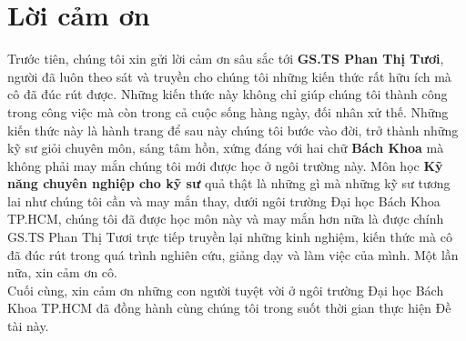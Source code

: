 \documentclass[12pt]{report}
\begin{document}
\newpage
	\chapter*{Lời cảm ơn}
		\par Trước tiên, chúng tôi xin gửi lời cảm ơn sâu sắc tới \textbf{GS.TS Phan Thị Tươi}, người đã luôn theo sát và truyền cho chúng tôi những kiến thức rất hữu ích mà cô đã đúc rút được. Những kiến thức này không chỉ giúp chúng tôi thành công trong công việc mà còn trong cả cuộc sống hàng ngày, đối nhân xử thế. Những kiến thức này là hành trang để sau này chúng tôi bước vào đời, trở thành những kỹ sư giỏi chuyên môn, sáng tâm hồn, xứng đáng với hai chữ \textbf{Bách Khoa} mà không phải may mắn chúng tôi mới được học ở ngôi trường này. Môn học \textbf{Kỹ năng chuyên nghiệp cho kỹ sư} quả thật là những gì mà những kỹ sư tương lai như chúng tôi cần và may mắn thay, dưới ngôi trường Đại học Bách Khoa TP.HCM, chúng tôi đã được học môn này và may mắn hơn nữa là được chính GS.TS Phan Thị Tươi trực tiếp truyền lại những kinh nghiệm, kiến thức mà cô đã đúc rút trong quá trình nghiên cứu, giảng dạy và làm việc của mình. Một lần nữa, xin cảm ơn cô. \\Cuối cùng, xin cảm ơn những con người tuyệt vời ở ngôi trường Đại học Bách Khoa TP.HCM đã đồng hành cùng chúng tôi trong suốt thời gian thực hiện Đề tài này.
\newpage
\end{document}
